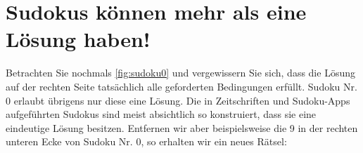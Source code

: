 \section{Sudokus können mehr als eine Lösung haben!}
Betrachten Sie nochmals \cref{fig:sudoku0} und vergewissern Sie sich, dass die Lösung auf der rechten Seite tatsächlich alle geforderten Bedingungen erfüllt. Sudoku Nr. 0 erlaubt übrigens nur diese eine Lösung. Die in Zeitschriften und Sudoku-Apps aufgeführten Sudokus sind meist absichtlich so konstruiert, dass sie eine eindeutige Lösung besitzen. Entfernen wir aber beispielsweise die 9 in der rechten unteren Ecke von Sudoku Nr. 0, so erhalten wir ein neues Rätsel:
\begin{figure}[H]
    \centering
{}
\end{figure}
